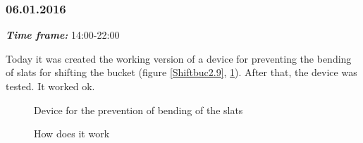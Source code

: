 \subsubsection{06.01.2016}
\textit{\textbf{Time frame:}} 14:00-22:00 

Today it was created the working version of a device for preventing the bending of slats for shifting the bucket (figure \ref{Shiftbuc2.9}, \ref{Shiftbuc2.10}). After that, the device was tested. It worked ok.

\begin{figure}[H]
	\begin{minipage}[h]{0.47\linewidth}
		\caption{Device for the prevention of bending of the slats}
		\label{Shiftbuc2.9}
	\end{minipage}
	\hfill
	\begin{minipage}[h]{0.47\linewidth}
		\caption{How does it work}
		\label{Shiftbuc2.10}
	\end{minipage}
\end{figure}

